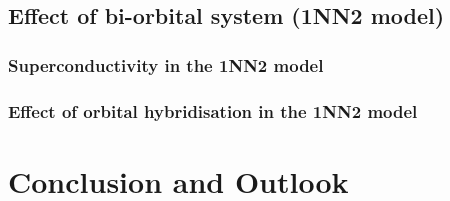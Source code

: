 \documentclass[12pt]{article}
\begin{document}
\subsection{Effect of bi-orbital system (1NN2 model)}
\label{subsec:1NN2Model}





\subsubsection{Superconductivity in the 1NN2 model}

\subsubsection{Effect of orbital hybridisation in the 1NN2 model}



\section{Conclusion and Outlook}


\newpage


\end{document}

